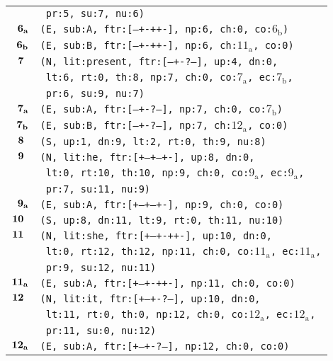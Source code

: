 \documentclass{article}
\begin{document}
\begin{minipage}{\textwidth}
{\begin{tabular}{|r|l|}
    & \texttt{\texttt{~pr:5,~su:7,~nu:6)}} \\
    ${\textbf{\textrm{6}}_{\textbf{\textrm{a}}}}$ & \texttt{\texttt{(E,~sub:A,~ftr:[---+-++-],~np:6,~ch:0,~co:${\textrm{6}_{\textrm{b}}}$)}} \\
    ${\textbf{\textrm{6}}_{\textbf{\textrm{b}}}}$ & \texttt{\texttt{(E,~sub:B,~ftr:[---+-++-],~np:6,~ch:${\textrm{11}_{\textrm{a}}}$,~co:0)}} \\
    ${\textbf{\textrm{7}}_{\phantom{z}}}$ & \texttt{\texttt{(N,~lit:present,~ftr:[---+-?--],~up:4,~dn:0,}} \\
    & \texttt{\texttt{~lt:6,~rt:0,~th:8,~np:7,~ch:0,~co:${\textrm{7}_{\textrm{a}}}$,~ec:${\textrm{7}_{\textrm{b}}}$,}} \\
    & \texttt{\texttt{~pr:6,~su:9,~nu:7)}} \\
    ${\textbf{\textrm{7}}_{\textbf{\textrm{a}}}}$ & \texttt{\texttt{(E,~sub:A,~ftr:[---+-?--],~np:7,~ch:0,~co:${\textrm{7}_{\textrm{b}}}$)}} \\
    ${\textbf{\textrm{7}}_{\textbf{\textrm{b}}}}$ & \texttt{\texttt{(E,~sub:B,~ftr:[---+-?--],~np:7,~ch:${\textrm{12}_{\textrm{a}}}$,~co:0)}} \\
    ${\textbf{\textrm{8}}_{\phantom{z}}}$ & \texttt{\texttt{(S,~up:1,~dn:9,~lt:2,~rt:0,~th:9,~nu:8)}} \\
    ${\textbf{\textrm{9}}_{\phantom{z}}}$ & \texttt{\texttt{(N,~lit:he,~ftr:[+--+--+-],~up:8,~dn:0,}} \\
    & \texttt{\texttt{~lt:0,~rt:10,~th:10,~np:9,~ch:0,~co:${\textrm{9}_{\textrm{a}}}$,~ec:${\textrm{9}_{\textrm{a}}}$,}} \\
    & \texttt{\texttt{~pr:7,~su:11,~nu:9)}} \\
    ${\textbf{\textrm{9}}_{\textbf{\textrm{a}}}}$ & \texttt{\texttt{(E,~sub:A,~ftr:[+--+--+-],~np:9,~ch:0,~co:0)}} \\
    ${\textbf{\textrm{10}}_{\phantom{z}}}$ & \texttt{\texttt{(S,~up:8,~dn:11,~lt:9,~rt:0,~th:11,~nu:10)}} \\
    ${\textbf{\textrm{11}}_{\phantom{z}}}$ & \texttt{\texttt{(N,~lit:she,~ftr:[+--+-++-],~up:10,~dn:0,}} \\
    & \texttt{\texttt{~lt:0,~rt:12,~th:12,~np:11,~ch:0,~co:${\textrm{11}_{\textrm{a}}}$,~ec:${\textrm{11}_{\textrm{a}}}$,}} \\
    & \texttt{\texttt{~pr:9,~su:12,~nu:11)}} \\
    ${\textbf{\textrm{11}}_{\textbf{\textrm{a}}}}$ & \texttt{\texttt{(E,~sub:A,~ftr:[+--+-++-],~np:11,~ch:0,~co:0)}} \\
    ${\textbf{\textrm{12}}_{\phantom{z}}}$ & \texttt{\texttt{(N,~lit:it,~ftr:[+--+-?--],~up:10,~dn:0,}} \\
    & \texttt{\texttt{~lt:11,~rt:0,~th:0,~np:12,~ch:0,~co:${\textrm{12}_{\textrm{a}}}$,~ec:${\textrm{12}_{\textrm{a}}}$,}} \\
    & \texttt{\texttt{~pr:11,~su:0,~nu:12)}} \\
    ${\textbf{\textrm{12}}_{\textbf{\textrm{a}}}}$ & \texttt{\texttt{(E,~sub:A,~ftr:[+--+-?--],~np:12,~ch:0,~co:0)}} \\
    \hline
  \end{tabular}
  }
\end{minipage}
\end{document}
